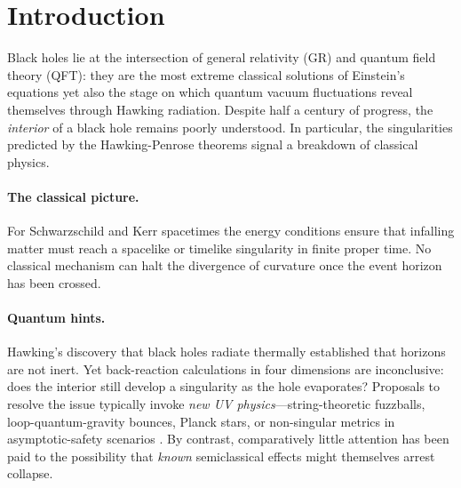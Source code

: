 \section{Introduction}
\label{sec:intro}

Black holes lie at the intersection of general relativity (GR) and quantum field theory (QFT): they are the most extreme classical solutions of Einstein's equations yet also the stage on which quantum vacuum fluctuations reveal themselves through Hawking radiation. Despite half a century of progress, the \emph{interior} of a black hole remains poorly understood.  In particular, the singularities predicted by the Hawking-Penrose theorems \cite{penrose1965singularity,hawking1975particle} signal a breakdown of classical physics.

\vspace{4pt}
\paragraph*{The classical picture.}
For Schwarzschild and Kerr spacetimes the energy conditions ensure that infalling matter must reach a spacelike or timelike singularity in finite proper time. No classical mechanism can halt the divergence of curvature once the event horizon has been crossed.

\vspace{4pt}
\paragraph*{Quantum hints.}
Hawking's discovery that black holes radiate thermally \cite{hawking1975particle} established that horizons are not inert. Yet back-reaction calculations in four dimensions are inconclusive: does the interior still develop a singularity as the hole evaporates? Proposals to resolve the issue typically invoke \emph{new UV physics}—string-theoretic fuzzballs, loop-quantum-gravity bounces, Planck stars, or non-singular metrics in asymptotic-safety scenarios \cite{bardeen1968non,hayward2006formation,bojowald2005nonsingular,rovelli1996black,Bonanno2023RegularBH}. By contrast, comparatively little attention has been paid to the possibility that \emph{known} semiclassical effects might themselves arrest collapse.

\vspace{4pt}
